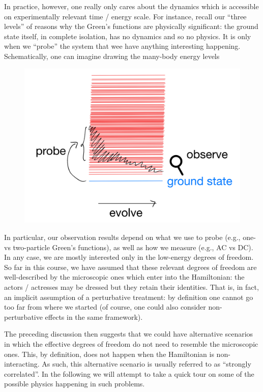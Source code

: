 In practice, however, one really only cares about the dynamics which is accessible on experimentally relevant time / energy scale. For instance, recall our ``three levels'' of reasons why the Green's functions are physically significant: the ground state itself, in complete isolation, has no dynamics and so no physics. It is only when we ``probe'' the system that wee have anything interesting happening. Schematically, one can imagine drawing the many-body energy levels
\begin{figure}[H]
    \centering
    \includegraphics[width=\textwidth]{jupyterbook/data/fig/lec25-fig01.png}
\end{figure}

In particular, our observation results depend on what we use to probe (e.g., one- vs two-particle Green's functions), as well as how we measure (e.g., AC vs DC). In any case, we are mostly interested only in the low-energy degrees of freedom. So far in this course, we have assumed that these relevant degrees of freedom are well-described by the microscopic ones which enter into the Hamiltonian: the actors / actresses may be dressed but they retain their identities. That is, in fact, an implicit assumption of a perturbative treatment: by definition one cannot go too far from where we started (of course, one could also consider non-perturbative effects in the same framework).

The preceding discussion then suggests that we could have alternative scenarios in which the effective degrees of freedom do not need to resemble the microscopic ones. This, by definition, does not happen when the Hamiltonian is non-interacting. As such, this alternative scenario is usually referred to as ``strongly correlated''. In the following we will attempt to take a quick tour on some of the possible physics happening in such problems.

